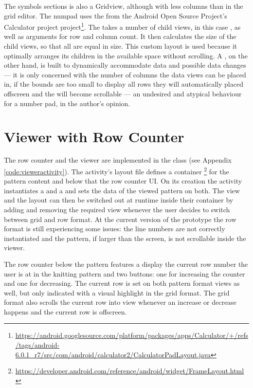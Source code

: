 The symbols sections is also a Gridview, although with less columns than in the grid editor. The numpad uses the  from the Android Open Source Project's Calculator project project\footnote{\url{https://android.googlesource.com/platform/packages/apps/Calculator/+/refs/tags/android-6.0.1_r7/src/com/android/calculator2/CalculatorPadLayout.java}}. The  takes a number of child views, in this case , as well as arguments for row and column count. It then calculates the size of the child views, so that all are equal in size. This custom layout is used because it optimally arranges its children in the available space without scrolling. A , on the other hand, is built to dynamically accommodate data and possible data changes --- it is only concerned with the number of columns the data views can be placed in, if the  bounds are too small to display all rows they will automatically placed offscreen and the  will become scrollable --- an undesired and atypical behaviour for a number pad, in the author's opinion.

\section{Viewer with Row Counter}
The row counter and the viewer are implemented in the  class (see Appendix \ref{code:vieweractivity}). The activity's layout file defines a container \footnote{\url{https://developer.android.com/reference/android/widget/FrameLayout.html}} for the pattern content and below that the row counter \gls{UI}. On its creation the activity instantiates a  and a  and sets the data of the viewed pattern on both. The view and the layout can then be switched out at runtime inside their container by adding and removing the required view whenever the user decides to switch between grid and row format.
At the current version of the prototype the row format is still experiencing some issues: the line numbers are not correctly instantiated and the pattern, if larger than the screen, is not scrollable inside the viewer.

The row counter below the pattern features a display the current row number the user is at in the knitting pattern and two buttons: one for increasing the counter and one for decreasing. The current row is set on both pattern format views as well, but only indicated with a visual highlight in the grid format. The grid format also scrolls the current row into view whenever an increase or decrease happens and the current row is offscreen. 


